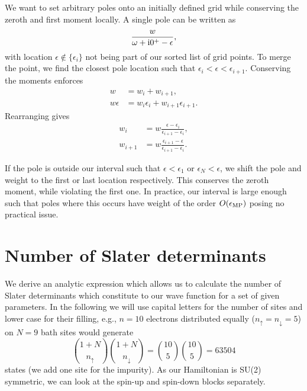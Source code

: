 We want to set arbitrary poles onto an initially defined grid while
conserving the zeroth and first moment locally.
A single pole can be written as
\begin{equation}
    \frac{w}{\omega + \mathrm{i}0^+ - \epsilon},
\end{equation}
with location $\epsilon\notin\{\epsilon_i\}$ not being part of our sorted list of grid points.
To merge the point,
we find the closest pole location such that $\epsilon_i < \epsilon < \epsilon_{i+1}$.
Conserving the moments enforces
\begin{align}
    w         & = w_i + w_{i+1},                         \\
    w\epsilon & = w_i\epsilon_i + w_{i+1}\epsilon_{i+1}.
\end{align}
Rearranging gives
\begin{align}
    w_i     & = w \frac{\epsilon - \epsilon_i}{\epsilon_{i+1} - \epsilon_i},     \\
    w_{i+1} & = w \frac{\epsilon_{i+1} - \epsilon}{\epsilon_{i+1} - \epsilon_i}.
\end{align}

If the pole is outside our interval such that
$\epsilon < \epsilon_1$ or $\epsilon_N < \epsilon$,
we shift the pole and weight to the first or last location respectively.
This conserves the zeroth moment,
while violating the first one.
In practice,
our interval is large enough such that poles where this occurs
have weight of the order $O\!\left(\epsilon_\mathrm{MP}\right)$ posing no practical issue.

\section{Number of Slater determinants}%
\label{app:number-slater-determinants}

We derive an analytic expression which allows us to calculate the number of Slater determinants
which constitute to our wave function for a set of given parameters.
In the following we will use capital letters for the number of sites
and lower case for their filling, e.g.,
$n=10$ electrons distributed equally ($n_\uparrow = n_\downarrow = 5$)
on $N=9$ bath sites would generate
\begin{equation}
    \binom{1+N}{n_\uparrow}\binom{1+N}{n_\downarrow}
    =
    \binom{10}{5}\binom{10}{5}
    =
    \num{63 504}
\end{equation}
states (we add one site for the impurity).
As our Hamiltonian is SU(2) symmetric, %
we can look at the spin-up and spin-down blocks separately.

